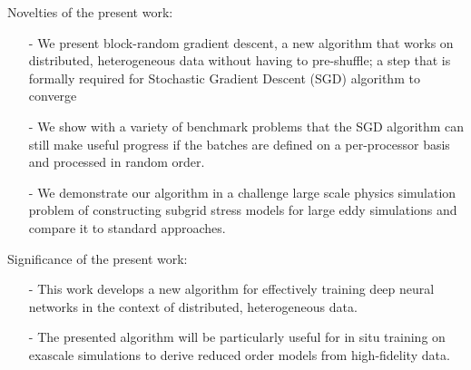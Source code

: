 \documentclass[12pt]{article}
\title{\FileTitle{}}
\date{\today}
\author{\FileAuthor, Marc T. Henry de Frahan, Ryan King, Ray W. Grout}
\begin{document}
\maketitle
Novelties of the present work:
\begin{itemize}
    \item [-] We present block-random gradient descent, a new algorithm that
        works on distributed, heterogeneous data without having to pre-shuffle;
        a step that is formally required for Stochastic Gradient Descent (SGD)
        algorithm to converge
    \item[-] We show with a variety of benchmark problems that the SGD
        algorithm can still make useful progress if the batches are defined on
        a per-processor basis and processed in random order.
    \item[-] We demonstrate our algorithm in a challenge large scale physics
        simulation problem of constructing subgrid stress models for large eddy
        simulations and compare it to standard approaches.
\end{itemize}

Significance of the present work:
\begin{itemize}
\item[-] This work develops a new algorithm for effectively training deep
    neural networks in the context of distributed, heterogeneous data.
\item[-] The presented algorithm will be particularly useful for in situ
    training on exascale simulations to derive reduced order models from
    high-fidelity data.
\end{itemize}
\end{document}
